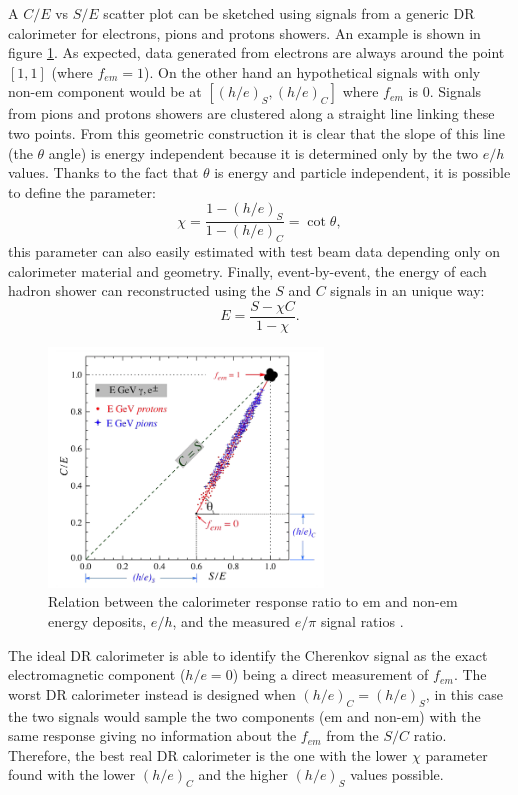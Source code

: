 A $C/E$ vs $S/E$ scatter plot can be sketched using signals from a generic DR calorimeter for electrons, pions and protons showers. An example is shown in figure \ref{fig:theta_DR}. As expected, data generated from electrons are always around the point $[1,1]$ (where $f_{em} = 1$). On the other hand an hypothetical signals with only non-em component would be at $[(h/e)_S,(h/e)_C]$ where $f_{em}$ is $0$. Signals from pions and protons showers are clustered along a straight line linking these two points. From this geometric construction it is clear that the slope of this line (the $\theta$ angle) is energy independent because it is determined only by the two $e/h$ values. Thanks to the fact that $\theta$ is energy and particle independent, it is possible to define the parameter:
\begin{equation}
    \chi = \frac{1-(h/e)_S}{1-(h/e)_C} = \cot{\theta},
\end{equation}
this parameter can also easily estimated with test beam data depending only on calorimeter material and geometry.
Finally, event-by-event, the energy of each hadron shower can reconstructed  using the $S$ and $C$ signals in an unique way:
\begin{equation}
    E = \frac{S - \chi C}{1 - \chi}.
\end{equation}

\begin{figure}
	\centering
	\includegraphics[width=0.65\textwidth]{IMG/Cap2/theta_DR.png}
	\caption{Relation between the calorimeter response ratio to em and non-em energy deposits, $e/h$, and the measured $e/\pi$ signal ratios \cite{Wigmans_e_gamma}.}
	\label{fig:theta_DR}
\end{figure}

The ideal DR calorimeter is able to identify the Cherenkov signal as the exact electromagnetic component ($h/e = 0$) being a direct measurement of $f_{em}$. The worst DR calorimeter instead is designed when $(h/e)_C = (h/e)_S$, in this case the two signals would sample the two components (em and non-em) with the same response giving no information about the $f_{em}$ from the $S/C$ ratio.  Therefore, the best real DR calorimeter is the one with the lower $\chi$ parameter found with the lower $(h/e)_C$ and the higher $(h/e)_S$ values possible. 

